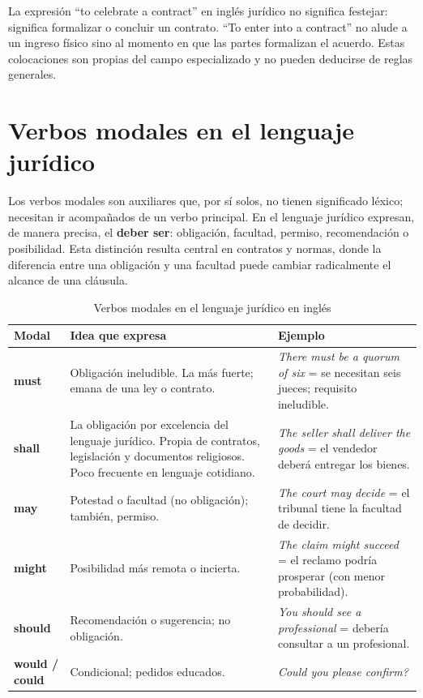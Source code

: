 \documentclass[12pt,oneside]{book}
\begin{document}
\begin{note}
La expresión ``to celebrate a contract'' en inglés jurídico no significa festejar: significa formalizar o concluir un contrato. ``To enter into a contract'' no alude a un ingreso físico sino al momento en que las partes formalizan el acuerdo. Estas colocaciones son propias del campo especializado y no pueden deducirse de reglas generales.
\end{note}

\section{Verbos modales en el lenguaje jurídico}
\label{sec:modales}

Los verbos modales son auxiliares que, por sí solos, no tienen significado léxico; necesitan ir acompañados de un verbo principal. En el lenguaje jurídico expresan, de manera precisa, el \textbf{deber ser}: obligación, facultad, permiso, recomendación o posibilidad. Esta distinción resulta central en contratos y normas, donde la diferencia entre una obligación y una facultad puede cambiar radicalmente el alcance de una cláusula.

\begin{table}[H]
\centering
\caption{Verbos modales en el lenguaje jurídico en inglés}
\begin{tabularx}{\textwidth}{>{\raggedright\arraybackslash}p{} >{\raggedright\arraybackslash}p{} >{\raggedright\arraybackslash}X}
\toprule
\textbf{Modal} & \textbf{Idea que expresa} & \textbf{Ejemplo} \\
\midrule
\textbf{must} & Obligación ineludible. La más fuerte; emana de una ley o contrato. & \textit{There must be a quorum of six} = se necesitan seis jueces; requisito ineludible. \\
\textbf{shall} & La obligación por excelencia del lenguaje jurídico. Propia de contratos, legislación y documentos religiosos. Poco frecuente en lenguaje cotidiano. & \textit{The seller shall deliver the goods} = el vendedor deberá entregar los bienes. \\
\textbf{may} & Potestad o facultad (no obligación); también, permiso. & \textit{The court may decide} = el tribunal tiene la facultad de decidir. \\
\textbf{might} & Posibilidad más remota o incierta. & \textit{The claim might succeed} = el reclamo podría prosperar (con menor probabilidad). \\
\textbf{should} & Recomendación o sugerencia; no obligación. & \textit{You should see a professional} = debería consultar a un profesional. \\
\textbf{would / could} & Condicional; pedidos educados. & \textit{Could you please confirm?} \\
\bottomrule
\end{tabularx}
\end{table}
\end{document}
